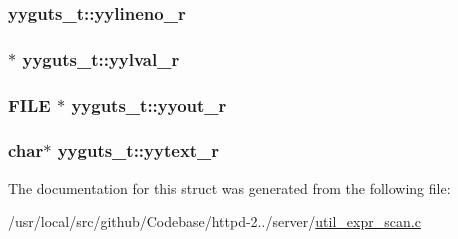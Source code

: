 \subsubsection[{\texorpdfstring{yylineno\+\_\+r}{yylineno_r}}]{ yyguts\+\_\+t\+::yylineno\+\_\+r}\hypertarget{structyyguts__t_aa9f13776b8d311e847cc7d974d49af4c}{}\label{structyyguts__t_aa9f13776b8d311e847cc7d974d49af4c}
\subsubsection[{\texorpdfstring{yylval\+\_\+r}{yylval_r}}]{$\ast$ yyguts\+\_\+t\+::yylval\+\_\+r}\hypertarget{structyyguts__t_a55dbdcd46a36d34adcbfc29be44d10cf}{}\label{structyyguts__t_a55dbdcd46a36d34adcbfc29be44d10cf}
\subsubsection[{\texorpdfstring{yyout\+\_\+r}{yyout_r}}]{\setlength{\rightskip}{0pt plus 5cm}F\+I\+LE $\ast$ yyguts\+\_\+t\+::yyout\+\_\+r}\hypertarget{structyyguts__t_a436368a905aaf12e809e265749c74031}{}\label{structyyguts__t_a436368a905aaf12e809e265749c74031}
\subsubsection[{\texorpdfstring{yytext\+\_\+r}{yytext_r}}]{\setlength{\rightskip}{0pt plus 5cm}char$\ast$ yyguts\+\_\+t\+::yytext\+\_\+r}\hypertarget{structyyguts__t_aebaa731ad6cbe2411d104925e5bb3f2c}{}\label{structyyguts__t_aebaa731ad6cbe2411d104925e5bb3f2c}


The documentation for this struct was generated from the following file\+:\begin{DoxyCompactItemize}
\item 
/usr/local/src/github/\+Codebase/httpd-\/2../server/\hyperlink{util__expr__scan_8c}{util\+\_\+expr\+\_\+scan.\+c}\end{DoxyCompactItemize}
